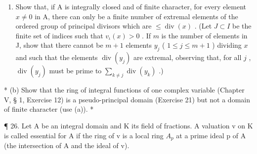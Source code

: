 \begin{enumerate}
\def\labelenumi{(\alph{enumi})}
\tightlist
\item
  Show that, if A is integrally closed and of finite character, for every element \(x \neq 0\) in A, there can only be a finite number of extremal elements of the ordered group of principal divisors which are \(\leqslant \operatorname{div}(x)\) . (Let \(J \subset I\) be the finite set of indices such that \(v_{\iota}(x) > 0\) . If \(m\) is the number of elements in J, show that there cannot be \(m + 1\) elements \(y_{j}\) ( \(1 \leqslant j \leqslant m + 1\) ) dividing \(x\) and such that the elements \(\operatorname{div}(y_{j})\) are extremal, observing that, for all \(j\) , \(\operatorname{div}(y_{j})\) must be prime to \(\sum_{k \neq j} \operatorname{div}(y_{k})\) .)
\end{enumerate}

* (b) Show that the ring of integral functions of one complex variable (Chapter V, § 1, Exercise 12) is a pseudo-principal domain (Exercise 21) but not a domain of finite character (use (a)). *

¶ 26. Let A be an integral domain and K its field of fractions. A valuation v on K is called essential for A if the ring of v is a local ring \(A_{p}\) at a prime ideal p of A (the intersection of A and the ideal of v).

